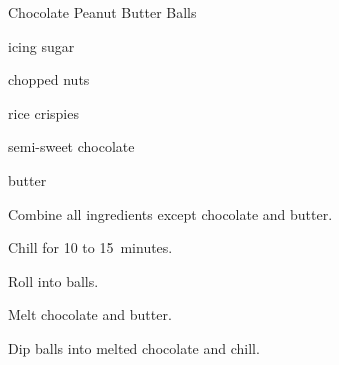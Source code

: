 \begin{recipe}{Chocolate Peanut Butter Balls}{}{}

\begin{ingredients}
\item {} 
\item {} icing sugar
\item \C{\half} chopped nuts
\item \C{\half} rice crispies
\item {} semi-sweet chocolate
\item {} butter
\end{ingredients}

\begin{directions}
\item Combine all ingredients except chocolate and butter.
\item Chill for 10 to 15~minutes.
\item Roll into balls.
\item Melt chocolate and butter.
\item Dip balls into melted chocolate and chill.
\end{directions}
\end{recipe}
